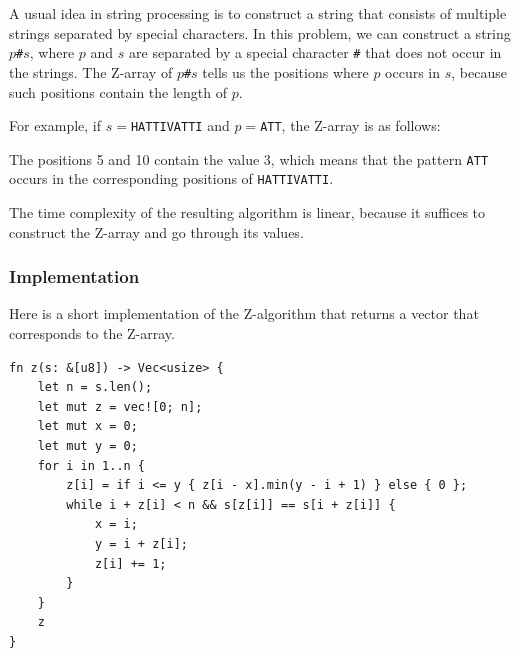 A usual idea in string processing is to
construct a string that consists of
multiple strings separated by special characters.
In this problem, we can construct a string
$p$\texttt{\#}$s$,
where $p$ and $s$ are separated by a special
character \texttt{\#} that does not occur
in the strings.
The Z-array of $p$\texttt{\#}$s$ tells us the positions
where $p$ occurs in $s$,
because such positions contain the length of $p$.

For example, if $s=$\texttt{HATTIVATTI} and $p=$\texttt{ATT},
the Z-array is as follows:

\begin{center}
\end{center}

The positions 5 and 10 contain the value 3,
which means that the pattern \texttt{ATT}
occurs in the corresponding positions
of \texttt{HATTIVATTI}.

The time complexity of the resulting algorithm
is linear, because it suffices to construct
the Z-array and go through its values.

\subsubsection{Implementation}

Here is a short implementation of the Z-algorithm
that returns a vector that corresponds to the Z-array.

\begin{lstlisting}
fn z(s: &[u8]) -> Vec<usize> {
    let n = s.len();
    let mut z = vec![0; n];
    let mut x = 0;
    let mut y = 0;
    for i in 1..n {
        z[i] = if i <= y { z[i - x].min(y - i + 1) } else { 0 };
        while i + z[i] < n && s[z[i]] == s[i + z[i]] {
            x = i;
            y = i + z[i];
            z[i] += 1;
        }
    }
    z
}
\end{lstlisting}
